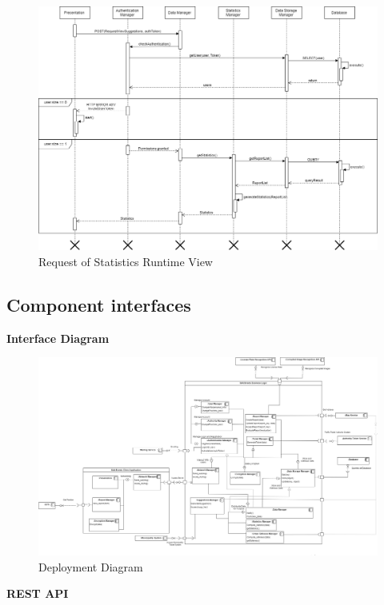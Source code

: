\begin{figure}[H]
          \includegraphics[scale=0.35]{Images/Seq_viewStatistics.png}
        \caption{Request of Statistics Runtime View}
\end{figure}

\subsection{Component interfaces}
\textbf{Interface Diagram} 

\begin{figure}[H]
\centering
\advance\leftskip-6cm
          \includegraphics[width=1.5\textwidth,left]{Images/Component_interface.png}
        \caption{Deployment Diagram}
\end{figure}

\textbf{REST API}\\\\


